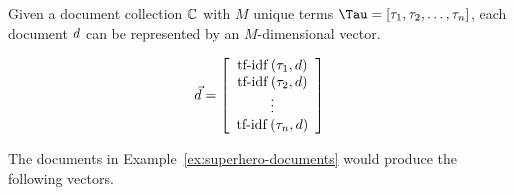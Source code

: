 		\begin{defn}
			Given a document collection $\mathbb{C}$ with $M$ unique terms $\terms = \left[\term_1, \term_2, \dotsc, \term_n \right]$, each document $d$ can be represented by an $M$-dimensional vector.
			
			$$
				\vec{d} = 
				\left[
				\begin{array}{c}
					\operatorname{tf-idf}\left(\tau_1, d\right) \\
					\operatorname{tf-idf}\left(\tau_2, d\right) \\
					\vdots \\
					\operatorname{tf-idf}\left(\tau_n, d\right)
				\end{array}
				\right]
			$$
		\end{defn}
		
		\begin{ex}
			The documents in Example~\ref{ex:superhero-documents} would produce the following vectors.
			

\end{ex}
